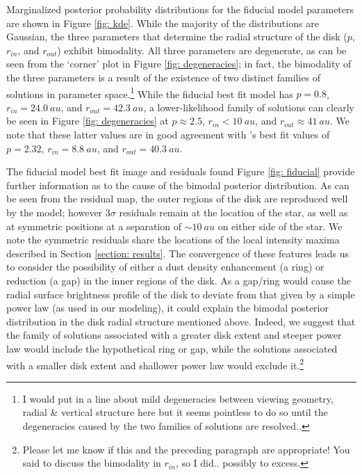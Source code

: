 \documentclass[12pt,oneside]{article}
\begin{document}
Marginalized posterior probability distributions for the fiducial model parameters are shown in Figure \ref{fig: kde}. 
While the majority of the distributions are Gaussian, the three parameters that determine the radial structure of the disk ($p$, $r_{in}$, and $r_{out}$) exhibit bimodality. 
All three parameters are degenerate, as can be seen from the `corner' plot in Figure \ref{fig: degeneracies}; in fact, the bimodality of the three parameters is a result of the existence of two distinct families of solutions in parameter space.\footnote{I would put in a line about mild degeneracies between viewing geometry, radial \& vertical structure here but it seems pointless to do so until the degeneracies caused by the two families of solutions are resolved..}
While the fiducial best fit model has $p=0.8$, $r_{in}=\SI{24.0}{au}$, and $r_{out}=\SI{42.3}{au}$, a lower-likelihood family of solutions can clearly be seen in Figure \ref{fig: degeneracies} at $p \approx 2.5$, $r_{in} < \SI{10}{au}$, and $r_{out} \approx \SI{41}{au}$.
We note that these latter values are in good agreement with \cite{macgregor13}'s best fit values of $p=2.32$, $r_{in}=\SI{8.8}{au}$, and $r_{out}=\SI{40.3}{au}$.

The fiducial model best fit image and residuals found Figure \ref{fig: fiducial} provide further information as to the cause of the bimodal posterior distribution.
As can be seen from the residual map, the outer regions of the disk are reproduced well by the model; however $3\sigma$ residuals remain at the location of the star, as well as at symmetric positions at a separation of $\sim \SI{10}{au}$ on either side of the star. 
We note the symmetric residuals share the locations of the local intensity maxima described in Section \ref{section: results}. 
The convergence of these features leads us to consider the possibility of either a dust density enhancement (a ring) or reduction (a gap) in the inner regions of the disk. 
As a gap/ring would cause the radial surface brightness profile of the disk to deviate from that given by a simple power law (as used in our modeling), it could explain the bimodal posterior distribution in the disk radial structure mentioned above.
Indeed, we suggest that the family of solutions associated with a greater disk extent and steeper power law would include the hypothetical ring or gap, while the solutions associated with a smaller disk extent and shallower power law would exclude it.\footnote{Please let me know if this and the preceding paragraph are appropriate! You said to discuss the bimodality in $r_{in}$, so I did.. possibly to excess.}
\end{document}
